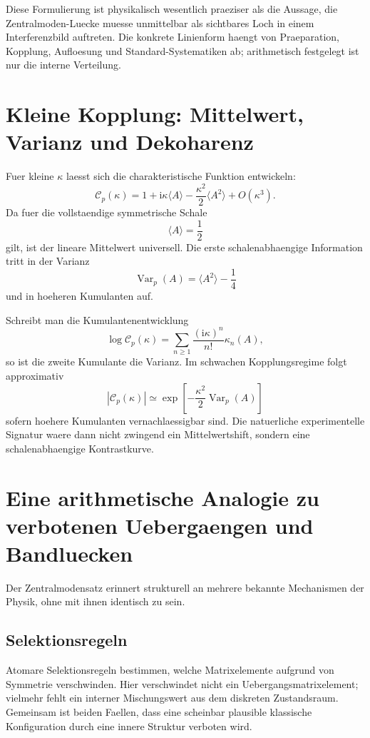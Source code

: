 \documentclass[11pt,a4paper]{article}
\theoremstyle{definition}
\newcommand{\ii}{\mathrm i}
\begin{document}
Diese Formulierung ist physikalisch wesentlich praeziser als die Aussage, die Zentralmoden-Luecke muesse unmittelbar als sichtbares Loch in einem Interferenzbild auftreten. Die konkrete Linienform haengt von Praeparation, Kopplung, Aufloesung und Standard-Systematiken ab; arithmetisch festgelegt ist nur die interne Verteilung.

\section{Kleine Kopplung: Mittelwert, Varianz und Dekoharenz}
Fuer kleine $\kappa$ laesst sich die charakteristische Funktion entwickeln:
\[
\mathcal C_p(\kappa)
=1+\ii\kappa\langle A\rangle
-\frac{\kappa^2}{2}\langle A^2\rangle+O(\kappa^3).
\]
Da fuer die vollstaendige symmetrische Schale
\[
\langle A\rangle=\frac12
\]
gilt, ist der lineare Mittelwert universell. Die erste schalenabhaengige Information tritt in der Varianz
\[
\operatorname{Var}_p(A)=\langle A^2\rangle-\frac14
\]
und in hoeheren Kumulanten auf.

Schreibt man die Kumulantenentwicklung
\[
\log\mathcal C_p(\kappa)
=\sum_{n\ge1}\frac{(\ii\kappa)^n}{n!}\kappa_n(A),
\]
so ist die zweite Kumulante die Varianz. Im schwachen Kopplungsregime folgt approximativ
\[
|\mathcal C_p(\kappa)|
\simeq
\exp\!\left[-\frac{\kappa^2}{2}\operatorname{Var}_p(A)\right]
\]
sofern hoehere Kumulanten vernachlaessigbar sind. Die natuerliche experimentelle Signatur waere dann nicht zwingend ein Mittelwertshift, sondern eine schalenabhaengige Kontrastkurve.

\section{Eine arithmetische Analogie zu verbotenen Uebergaengen und Bandluecken}
Der Zentralmodensatz erinnert strukturell an mehrere bekannte Mechanismen der Physik, ohne mit ihnen identisch zu sein.

\subsection{Selektionsregeln}
Atomare Selektionsregeln bestimmen, welche Matrixelemente aufgrund von Symmetrie verschwinden. Hier verschwindet nicht ein Uebergangsmatrixelement; vielmehr fehlt ein interner Mischungswert aus dem diskreten Zustandsraum. Gemeinsam ist beiden Faellen, dass eine scheinbar plausible klassische Konfiguration durch eine innere Struktur verboten wird.
\end{document}
